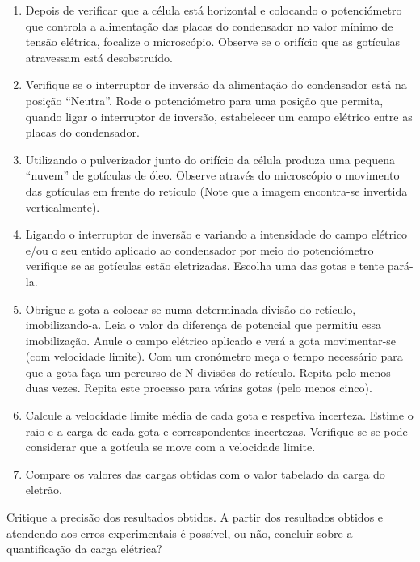 \documentclass[a4paper,twoside,12pt]{article}      %
\begin{document}
\begin{enumerate}
\item   Depois de verificar que a célula está horizontal e colocando o potenciómetro que 
controla a alimentação das placas do condensador no valor mínimo de tensão elétrica,
focalize o microscópio. Observe se o orifício que as gotículas atravessam está 
desobstruído.
\item    Verifique se o interruptor de inversão da alimentação do condensador está na posição ``Neutra''.
Rode o potenciómetro para uma posição que permita, quando ligar o interruptor de inversão, estabelecer um campo elétrico entre as placas do condensador. 
\item     Utilizando o pulverizador junto do orifício da célula produza uma pequena ``nuvem'' %
de gotículas de óleo. Observe através do microscópio o movimento das gotículas em 
frente do retículo (Note que a imagem encontra-se invertida verticalmente).
\item     Ligando o interruptor de inversão e variando a intensidade do campo elétrico e/ou o seu entido aplicado ao condensador por meio do 
potenciómetro verifique se as gotículas estão eletrizadas. Escolha uma das gotas e tente pará-la.
 \item Obrigue a gota a colocar-se numa determinada divisão do retículo, imobilizando-a. 
Leia o valor da diferença de potencial que permitiu essa imobilização. Anule o 
campo elétrico aplicado e verá a gota movimentar-se (com velocidade limite). Com um 
cronómetro meça o tempo necessário para que a gota faça um percurso de N divisões
do retículo. Repita pelo menos duas vezes. Repita este processo para várias gotas (pelo 
menos cinco). 
\item   Calcule a velocidade limite média de cada gota e respetiva incerteza. Estime o raio e 
a carga de cada gota e correspondentes incertezas. Verifique se se pode considerar 
que a gotícula se move com a velocidade limite.
\item   Compare os valores das cargas obtidas com o valor  tabelado da carga do eletrão.
\end{enumerate}

Critique a precisão dos resultados obtidos. A partir dos resultados obtidos e atendendo
aos erros experimentais é possível, ou não, concluir sobre a quantificação da carga elétrica?
\end{document}
